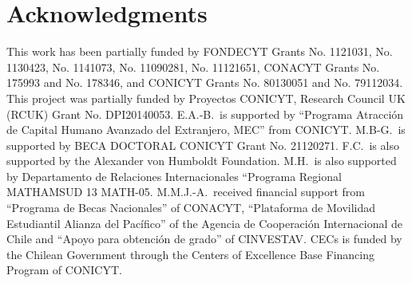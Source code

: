 \documentclass[prd,twocolumn,superscriptaddress,amsmath,amssymb,nofootinbib]{revtex4-1}
\begin{document}
\section{Acknowledgments}

This work has been partially funded by FONDECYT Grants No.
1121031, No.
 1130423, No.
 1141073, No.
 11090281, No.
 11121651, CONACYT Grants No. 175993 and No.
178346, and CONICYT Grants No.  80130051 and No.  79112034. This project was partially funded by Proyectos
CONICYT, Research Council UK (RCUK) Grant No. DPI20140053. E.A.-B.\ is supported
by ``Programa Atracci\'{o}n de Capital Humano Avanzado del
Extranjero, MEC'' from CONICYT. M.B-G.\ is supported by BECA
DOCTORAL CONICYT Grant No. 21120271. F.C.\ is also supported by the
Alexander von Humboldt Foundation. M.H.\ is also supported by
Departamento de Relaciones Internacionales ``Programa Regional
MATHAMSUD 13 MATH-05. M.M.J.-A.\ received financial support from
``Programa de Becas Nacionales'' of CONACYT, ``Plataforma de
Movilidad Estudiantil Alianza del Pac\'ifico'' of the Agencia
de Cooperaci\'on Internacional de Chile and ``Apoyo para
obtenci\'on de grado'' of CINVESTAV. CECs is funded by the
Chilean Government through the Centers of Excellence Base
Financing Program of CONICYT.
\end{document}
